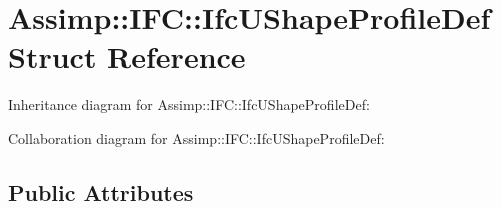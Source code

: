 \hypertarget{struct_assimp_1_1_i_f_c_1_1_ifc_u_shape_profile_def}{\section{Assimp\+:\+:I\+F\+C\+:\+:Ifc\+U\+Shape\+Profile\+Def Struct Reference}
\label{struct_assimp_1_1_i_f_c_1_1_ifc_u_shape_profile_def}
}


Inheritance diagram for Assimp\+:\+:I\+F\+C\+:\+:Ifc\+U\+Shape\+Profile\+Def\+:


Collaboration diagram for Assimp\+:\+:I\+F\+C\+:\+:Ifc\+U\+Shape\+Profile\+Def\+:
\subsection*{Public Attributes}
